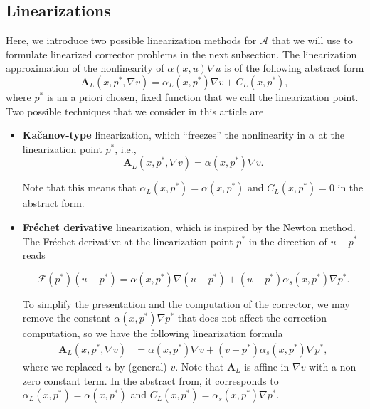 \documentclass{article}
\begin{document}
 
\subsection{Linearizations}

Here, we introduce two possible linearization methods for $\mathcal A$ that we will use to formulate linearized corrector problems in the next subsection. The linearization approximation of the nonlinearity of $\alpha(x,u)\nabla u$ is of the following abstract form \[\mathbf{A}_L(x,p^*,\nabla v)= \alpha_L(x,p^*)\nabla v + C_L(x,p^*),\] 
where $p^*$ is an a priori chosen, fixed function that we call the linearization point. Two possible techniques that we consider in this article are
\begin{itemize}
    \item  \textbf{Kačanov-type} linearization, which ``freezes'' the nonlinearity  in  $\alpha$ at the linearization point $p^*$, i.e.,
    \[\mathbf{A}_L(x,p^*,\nabla v)= \alpha(x,p^*)\nabla v.\] 
    
    Note that this means that $\mathcal{\alpha}_L(x,p^*) =\alpha(x,p^*)$ and $C_L(x,p^*)=0$ in the abstract form.
  \item \textbf{Fréchet derivative} linearization, which is inspired by the Newton method. The Fréchet derivative at the linearization point $p^*$ in the direction of $u-p^*$ reads
     
\[ \mathcal{F}(p^*)(u-p^*)=\alpha(x,p^*)\nabla (u-p^*) + (u-p^*)\alpha_s(x, p^*)\nabla p^*.\]
 
To simplify the presentation and the computation of the corrector, we may remove the constant $\alpha(x,p^*)\nabla p^*$ that does not affect the correction computation, so we have the following linearization formula 
\begin{align*}
   \mathbf{A}_L(x,p^*,\nabla v)&=\alpha(x,p^*)\nabla v+ (v-p^*)\alpha_s(x, p^*)\nabla p^*,
\end{align*}
where we replaced $u$ by (general) $v$.
     Note that $\mathbf{A}_L$ is affine in $\nabla v$ with a non-zero constant term. In the abstract from, it corresponds to $\mathcal{\alpha}_L(x,p^*) =\alpha(x,p^*)$ and $C_L(x,p^*)=\alpha_s(x, p^*)\nabla p^*$. 

\end{itemize}
\end{document}
